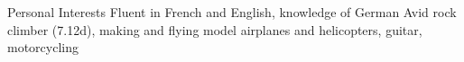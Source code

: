 \begin{rubric}{Personal Interests}
\entry*[Languages]%
  Fluent in French and English, knowledge of German
%
%
\entry*[Hobbies]%
  Avid rock climber (7.12d), 
  making and flying model airplanes and helicopters,
  guitar,
  motorcycling
%
%
\end{rubric} 
